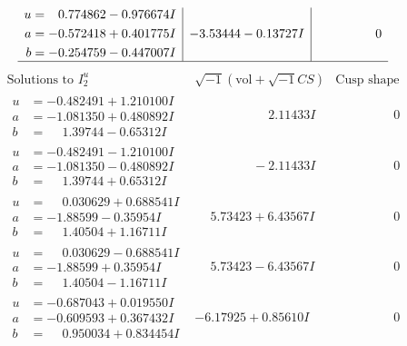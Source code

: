 \documentclass[1p]{elsarticle_modified}
\theoremstyle{definition}
\newcommand{\I}{\sqrt{-1}}
\begin{document}
$$\begin{array}{c|c|c}
\begin{aligned}
u &= \phantom{-}0.774862 - 0.976674 I \\
a &= -0.572418 + 0.401775 I \\
b &= -0.254759 - 0.447007 I\end{aligned}
 & -3.53444 - 0.13727 I & \phantom{-0.000000 } 0\\
 \hline 
 \end{array}$$\newpage$$\begin{array}{c|c|c}  
\text{Solutions to }I^u_{2}& \I (\text{vol} + \sqrt{-1}CS) & \text{Cusp shape}\\
 \hline 
\begin{aligned}
u &= -0.482491 + 1.210100 I \\
a &= -1.081350 + 0.480892 I \\
b &= \phantom{-}1.39744 - 0.65312 I\end{aligned}
 & \phantom{-0.000000 -}2.11433 I & \phantom{-0.000000 } 0 \\ \hline\begin{aligned}
u &= -0.482491 - 1.210100 I \\
a &= -1.081350 - 0.480892 I \\
b &= \phantom{-}1.39744 + 0.65312 I\end{aligned}
 & \phantom{-0.000000 } -2.11433 I & \phantom{-0.000000 } 0 \\ \hline\begin{aligned}
u &= \phantom{-}0.030629 + 0.688541 I \\
a &= -1.88599 - 0.35954 I \\
b &= \phantom{-}1.40504 + 1.16711 I\end{aligned}
 & \phantom{-}5.73423 + 6.43567 I & \phantom{-0.000000 } 0 \\ \hline\begin{aligned}
u &= \phantom{-}0.030629 - 0.688541 I \\
a &= -1.88599 + 0.35954 I \\
b &= \phantom{-}1.40504 - 1.16711 I\end{aligned}
 & \phantom{-}5.73423 - 6.43567 I & \phantom{-0.000000 } 0 \\ \hline\begin{aligned}
u &= -0.687043 + 0.019550 I \\
a &= -0.609593 + 0.367432 I \\
b &= \phantom{-}0.950034 + 0.834454 I\end{aligned}
 & -6.17925 + 0.85610 I & \phantom{-0.000000 } 0 \\ \hline\begin{aligned}

\end{aligned}
\end{array}$$
\end{document}
